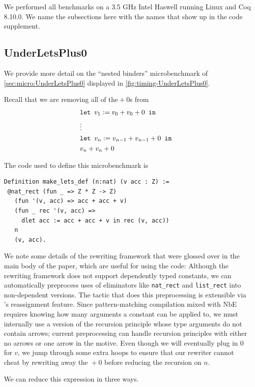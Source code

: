 \begin{subappendices}
We performed all benchmarks on a 3.5 GHz Intel Haswell running Linux and Coq 8.10.0.
We name the subsections here with the names that show up in the code supplement.

\subsection{UnderLetsPlus0} \label{sec:UnderLetsPlus0-more}

We provide more detail on the ``nested binders'' microbenchmark of \autoref{sec:micro:UnderLetsPlus0} displayed in \autoref{fig:timing-UnderLetsPlus0}.

Recall that we are removing all of the${}+0$s from
{\small \begin{align*}
  & \letin[{v_1 := v_0 + v_0 + 0}{}] \\
  & \vdots \\
  & \letin[{v_n := v_{n-1} + v_{n-1} + 0}{}] \\
  & v_n + v_n + 0
\end{align*}}%

The code used to define this microbenchmark is
\begin{verbatim}
Definition make_lets_def (n:nat) (v acc : Z) :=
 @nat_rect (fun _ => Z * Z -> Z)
   (fun '(v, acc) => acc + acc + v)
   (fun _ rec '(v, acc) =>
     dlet acc := acc + acc + v in rec (v, acc))
   n
   (v, acc).
\end{verbatim}
We note some details of the rewriting framework that were glossed over in the main body of the paper, which are useful for using the code:
Although the rewriting framework does not support dependently typed constants, we can automatically preprocess uses of eliminators like \texttt{nat_rect} and \texttt{list_rect} into non-dependent versions.
The tactic that does this preprocessing is extensible via \Ltac{}'s reassignment feature.
Since pattern-matching compilation mixed with NbE requires knowing how many arguments a constant can be applied to, we must internally use a version of the recursion principle whose type arguments do not contain arrows; current preprocessing can handle recursion principles with either no arrows or one arrow in the motive.
Even though we will eventually plug in 0 for $v$, we jump through some extra hoops to ensure that our rewriter cannot cheat by rewriting away the ${}+0$ before reducing the recursion on $n$.

We can reduce this expression in three ways.


\end{subappendices}
